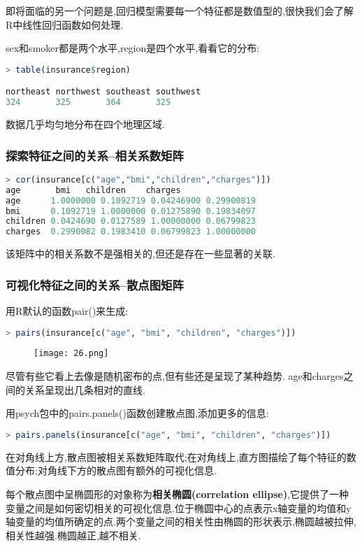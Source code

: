 \documentclass[11pt,a4paper,oneside]{book}
\begin{document}
即将面临的另一个问题是,回归模型需要每一个特征都是数值型的,很快我们会了解R中线性回归函数如何处理.

sex和smoker都是两个水平,region是四个水平,看看它的分布:

\begin{lstlisting}[language=r]
> table(insurance$region)

northeast northwest southeast southwest 
324       325       364       325 
\end{lstlisting}
数据几乎均匀地分布在四个地理区域.

\subsubsection{探索特征之间的关系--相关系数矩阵}

\begin{lstlisting}[language=r]
> cor(insurance[c("age","bmi","children","charges")])
age       bmi   children    charges
age      1.0000000 0.1092719 0.04246900 0.29900819
bmi      0.1092719 1.0000000 0.01275890 0.19834097
children 0.0424690 0.0127589 1.00000000 0.06799823
charges  0.2990082 0.1983410 0.06799823 1.00000000
\end{lstlisting}
该矩阵中的相关系数不是强相关的,但还是存在一些显著的关联.
\subsubsection{可视化特征之间的关系--散点图矩阵}
用R默认的函数pair()来生成:
\begin{lstlisting}[language=r]
> pairs(insurance[c("age", "bmi", "children", "charges")])
\end{lstlisting}
\begin{figure}[H]
	\centering
	\texttt{[image: 26.png]}
\end{figure}
尽管有些它看上去像是随机密布的点,但有些还是呈现了某种趋势. age和charges之间的关系呈现出几条相对的直线.

用psych包中的pairs.panels()函数创建散点图,添加更多的信息:
\begin{lstlisting}[language=r]
> pairs.panels(insurance[c("age", "bmi", "children", "charges")])
\end{lstlisting}

在对角线上方,散点图被相关系数矩阵取代;在对角线上,直方图描绘了每个特征的数值分布;对角线下方的散点图有额外的可视化信息.

每个散点图中呈椭圆形的对象称为\textbf{相关椭圆(correlation ellipse)},它提供了一种变量之间是如何密切相关的可视化信息.位于椭圆中心的点表示x轴变量的均值和y轴变量的均值所确定的点.两个变量之间的相关性由椭圆的形状表示,椭圆越被拉伸,相关性越强.椭圆越正,越不相关.
\end{document}
